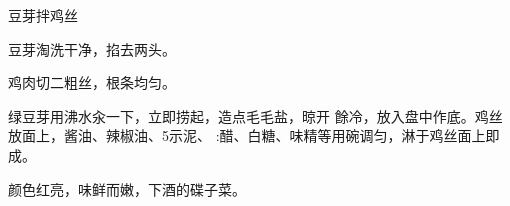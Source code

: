 \begin{recipe}[银芽拌鸡丝]{豆芽拌鸡丝}

\ingredients



\cooking

\step 豆芽淘洗干净，掐去两头。

\step 鸡肉切二粗丝，根条均匀。

\step 绿豆芽用沸水汆一下，立即捞起，造点毛毛盐，晾开 餘冷，放入盘中作底。鸡丝放面上，酱油、辣椒油、5示泥、 :醋、白糖、味精等用碗调匀，淋于鸡丝面上即成。

\notes

颜色红亮，味鲜而嫩，下酒的碟子菜。

\end{recipe}

